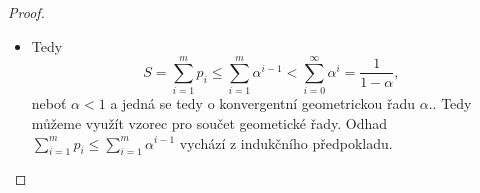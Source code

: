 \begin{proof}
\begin{itemize}
\[\begin{aligned}
        &\mathbf{P}[h_1,\ldots,h_{i-1}\text{ jsou obsazené a } h_i
        \text{ je prázdná}] + \\
        &\mathbf{P}[h_1,\ldots,h_{i-1}\text{ jsou obsazené a } h_i
        \text{ je obsazená}],
    \end{aligned}
    \]
    \textit{Zde pravděpodobnost že prvních $i-1$ přihrádek je plných je určitě stejná jako že jich je prvních $i-1$ je obsazených a pak obě možné možnosti. Tedy nám nic nespecifikují.} \\\\
    platí $p_i = q_i + p_{i+1}$, čili $q_i = p_i - p_{i+1}$. Proto
    \[
    \begin{aligned}
        S
        &= \sum_{i=1}^{m} i \cdot (p_i - p_{i+1}) \\
        &= \sum_{i=1}^{m} i \cdot p_i
           - \sum_{i=1}^{m} i \cdot p_{i+1} \\
        &= \sum_{i=1}^{m} i \cdot p_i
           - \sum_{i=2}^{m+1} (i-1) \cdot p_i \\
        &= \sum_{i=1}^{m} p_i \cdot (i-(i-1)) \\
        &= \sum_{i=1}^{m} p_i.
    \end{aligned}
    \]

    \item Tedy
    \[
        S = \sum_{i=1}^{m} p_i
        \leq \sum_{i=1}^{m} \alpha^{i-1}
        < \sum_{i=0}^{\infty} \alpha^i
        = \frac{1}{1-\alpha},
    \]
neboť $\alpha < 1$ a jedná se tedy o konvergentní geometrickou řadu $\alpha.$. Tedy můžeme využít vzorec pro součet geometické řady. Odhad $\sum_{i=1}^{m} p_i \leq \sum_{i=1}^{m} \alpha^{i-1}$ vychází z indukčního předpokladu. \\
\end{itemize}
\end{proof}